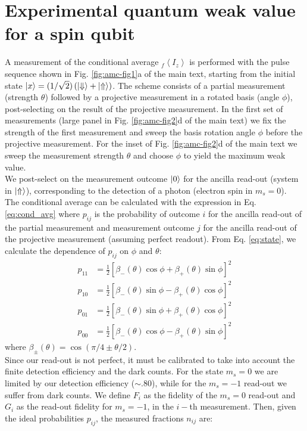 \section* {Experimental quantum weak value for a spin qubit}
A measurement of the conditional average $ _f \left \langle I_z \right \rangle$ is performed with the pulse sequence shown in Fig. \ref{fig:amc-fig1}a of the main text, starting from the initial state $\left|x\right> = (1/\sqrt{2}) \left( \left|\Downarrow\right> + \left|\Uparrow\right> \right)$. The scheme consists of a partial measurement (strength $\theta$) followed by a projective measurement in a rotated basis (angle $\phi$), post-selecting on the result of the projective measurement. In the first set of measurements (large panel in Fig. \ref{fig:amc-fig2}d of the main text) we fix the strength of the first measurement and sweep the basis rotation angle $\phi$ before the projective measurement. For the inset of Fig. \ref{fig:amc-fig2}d of the main text we sweep the measurement strength $\theta$ and choose $\phi$ to yield the maximum weak value. \\
We post-select on the measurement outcome $\left|0\right>$ for the ancilla read-out (system in $\left|\Uparrow\right>$), corresponding to the detection of a photon (electron spin in $m_s=0$). \\
The conditional average can be calculated with the expression in Eq. \ref {eq:cond_avg} where $p_{ij}$ is the probability of outcome $i$ for the ancilla read-out of the partial measurement and measurement outcome $j$ for the ancilla read-out of the projective measurement (assuming perfect readout). From Eq. \ref{eq:state}, we calculate the dependence of $p_{ij}$ on $\phi$ and $\theta$:
\begin{equation}
\label{eq:prob_wm}
  \begin{split}
  p_{11}&=\frac{1}{2} \left[ \beta_-(\theta) \cos\phi + \beta_+ (\theta) \sin\phi \right]^2  \\
  p_{10}&= \frac{1}{2} \left[ \beta_-(\theta) \sin\phi - \beta_+ (\theta) \cos\phi\right]^2 \\
  p_{01}&= \frac{1}{2} \left[ \beta_-(\theta) \sin\phi + \beta_+ (\theta) \cos\phi\right]^2 \\
  p_{00}&=\frac{1}{2} \left[ \beta_-(\theta) \cos\phi - \beta_+ (\theta) \sin\phi \right]^2 
  \end{split}
\end{equation}
where $\beta_{\pm} (\theta) = \cos (\pi/4 \pm \theta/2)$.\\
 
Since our read-out is not perfect, it must be calibrated to take into account the finite detection efficiency and the dark counts. For the state $m_s=0$ we are limited by our detection efficiency ($\sim .80$), while for the $m_s=-1$ read-out we suffer from dark counts. We define $F_i$ as the fidelity of the $m_s=0$ read-out and $G_i$ as the read-out fidelity for $m_s=-1$, in the $i-$th measurement.
Then, given the ideal probabilities $p_{ij}$, the measured fractions $n_{ij}$ are:
 
